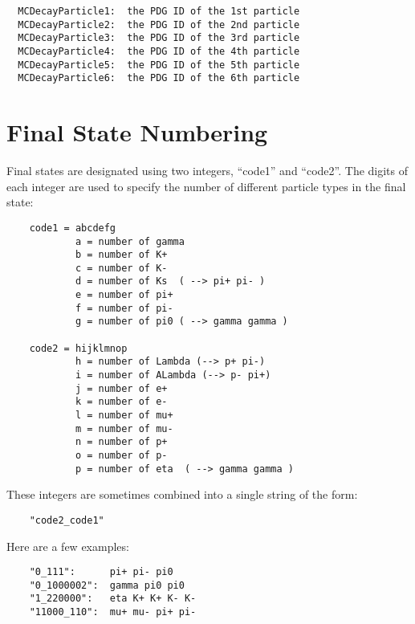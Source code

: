 \documentclass[11pt]{article}
\begin{document}
\begin{verbatim}
  MCDecayParticle1:  the PDG ID of the 1st particle
  MCDecayParticle2:  the PDG ID of the 2nd particle
  MCDecayParticle3:  the PDG ID of the 3rd particle
  MCDecayParticle4:  the PDG ID of the 4th particle
  MCDecayParticle5:  the PDG ID of the 5th particle
  MCDecayParticle6:  the PDG ID of the 6th particle
\end{verbatim}

\section{Final State Numbering}
\label{sec:numbering}

Final states are designated using two integers, ``code1'' and ``code2''.  The digits of each integer are used to specify the number of different particle types in the final state:
\begin{verbatim}
    code1 = abcdefg
            a = number of gamma
            b = number of K+
            c = number of K-
            d = number of Ks  ( --> pi+ pi- )
            e = number of pi+
            f = number of pi-
            g = number of pi0 ( --> gamma gamma )

    code2 = hijklmnop
            h = number of Lambda (--> p+ pi-)
            i = number of ALambda (--> p- pi+)
            j = number of e+
            k = number of e-
            l = number of mu+
            m = number of mu-
            n = number of p+
            o = number of p-
            p = number of eta  ( --> gamma gamma )
\end{verbatim}
These integers are sometimes combined into a single string of the form:
\begin{verbatim}
    "code2_code1"
\end{verbatim}
Here are a few examples:
\begin{verbatim}
    "0_111":      pi+ pi- pi0
    "0_1000002":  gamma pi0 pi0
    "1_220000":   eta K+ K+ K- K-
    "11000_110":  mu+ mu- pi+ pi-
\end{verbatim}
\end{document}
